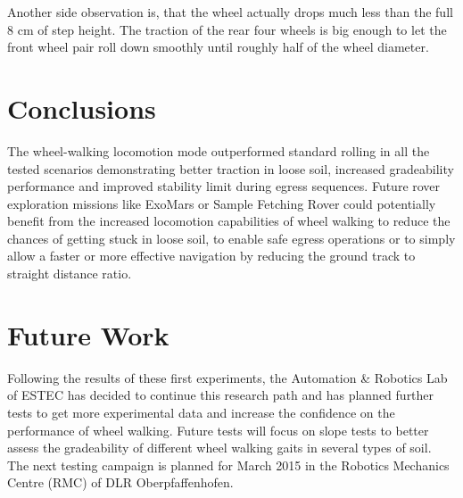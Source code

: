 \documentclass[a4paper,twocolumn]{esapub2005} %
\begin{document}
Another side observation is, that the wheel actually drops much less than the full 8 cm of step height. The traction of the rear four wheels is big enough to let the front wheel pair roll down smoothly until roughly half of the wheel diameter.




\section{Conclusions}

The wheel-walking locomotion mode outperformed standard rolling in all the tested scenarios demonstrating better traction in loose soil, increased gradeability performance and improved stability limit during egress sequences. Future rover exploration missions like ExoMars or Sample Fetching Rover could potentially benefit from the increased locomotion capabilities of wheel walking to reduce the chances of getting stuck in loose soil, to enable safe egress operations or to simply allow a faster or more effective navigation by reducing the ground track to straight distance ratio.

\section{Future Work}

Following the results of these first experiments, the Automation \& Robotics Lab of ESTEC has decided to continue this research path and has planned further tests to get more experimental data and increase the confidence on the performance of wheel walking. 
Future tests will focus on slope tests to better assess the gradeability of different wheel walking gaits in several types of soil.
The next testing campaign is planned for March 2015 in the Robotics Mechanics Centre (RMC) of DLR Oberpfaffenhofen.


\vspace{-3 mm}




\end{document}
